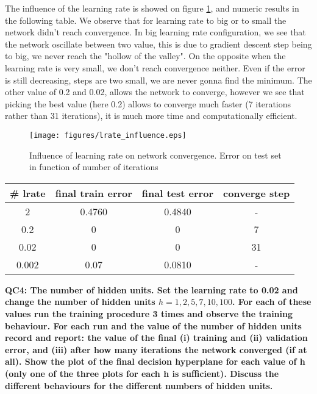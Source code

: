 \documentclass[a4paper,11pt]{exam}
\begin{document}
The influence of the learning rate is showed on figure \ref{lrate_influence}, and numeric results in the following table. We observe that for learning rate to big or to small the network didn't reach convergence. In big learning rate configuration, we see that the network oscillate between two value, this is due to gradient descent step being to big, we never reach the "hollow of the valley". On the opposite when the learning rate is very small, we don't reach convergence neither. Even if the error is still decreasing, steps are two small, we are never gonna find the minimum. The other value of 0.2 and 0.02, allows the network to converge, however we see that picking the best value (here 0.2) allows to converge much faster (7 iterations rather than 31 iterations), it is much more time and computationally efficient.

\begin{figure}[!h]
\centering
\texttt{[image: figures/lrate\_influence.eps]}
\caption{Influence of learning rate on network convergence. Error on test set in function of number of iterations}    
\label{lrate_influence}
\end{figure}


\begin{center}
\begin{tabular}{c |  c | c | c }
	\# lrate & final train error & final test error & converge step \\
	\hline
	   2 & 0.4760 & 0.4840 & - \\
           0.2 & 0 & 0 & 7\\
           0.02 & 0 & 0 & 31\\
           0.002 & 0.07 & 0.0810 & -\\
	 \hline
\end{tabular}
\end{center}



\textbf{QC4: The number of hidden units. Set the learning rate to 0.02 and change the number of hidden units $h = {1, 2, 5, 7, 10, 100}$. For each of these values run the training procedure 3 times and observe the training behaviour. For each run and the value of the number of hidden units record and report: the value of the final (i) training and (ii) validation error, and (iii) after how many iterations the network converged (if at all). Show the plot of the final decision hyperplane for each value of h (only one of the three plots for each h is sufficient). Discuss the different behaviours for the different numbers of hidden units.\\}
\end{document}
